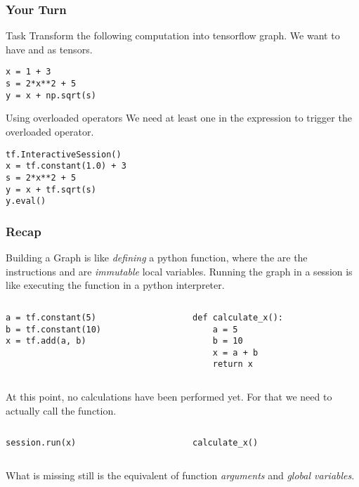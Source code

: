 \begin{frame}[fragile]  %
    \frametitle{Your Turn}
    \begin{block}{Task}
        Transform the following computation into tensorflow graph. We want to have  and  as tensors.
    \begin{lstlisting}
x = 1 + 3
s = 2*x**2 + 5
y = x + np.sqrt(s)
    \end{lstlisting}
    \end{block}
    \begin{block}{Using overloaded operators}
    We need at least one  in the expression to trigger the overloaded operator.
    \begin{lstlisting}
tf.InteractiveSession()
x = tf.constant(1.0) + 3
s = 2*x**2 + 5
y = x + tf.sqrt(s)
y.eval()
    \end{lstlisting}        
    \end{block}
\end{frame}


\begin{frame}[fragile]
    \frametitle{Recap}
    Building a Graph is like \emph{defining} a python function, where the  are the instructions 
    and  are \emph{immutable} local variables. Running the graph in a session is like executing 
    the function in a python interpreter.
    \pause
    \begin{columns}
    \begin{column}{0.5\textwidth}
    \begin{lstlisting}
a = tf.constant(5)
b = tf.constant(10)
x = tf.add(a, b)
    \end{lstlisting}
    \end{column}
    \begin{column}{0.5\textwidth}
    \begin{lstlisting}
def calculate_x():
    a = 5
    b = 10
    x = a + b
    return x
    \end{lstlisting}
    \end{column}
    \end{columns}
    \pause
    At this point, no calculations have been performed yet. For that we need to actually call the function.
    \begin{columns}
    \begin{column}{0.5\textwidth}
    \begin{lstlisting}
session.run(x)
    \end{lstlisting}
    \end{column}
    \begin{column}{0.5\textwidth}
    \begin{lstlisting}
calculate_x()
    \end{lstlisting}
    \end{column}
    \end{columns}
    \pause
    What is missing still is the equivalent of function \emph{arguments} and \emph{global variables}.
\end{frame}
